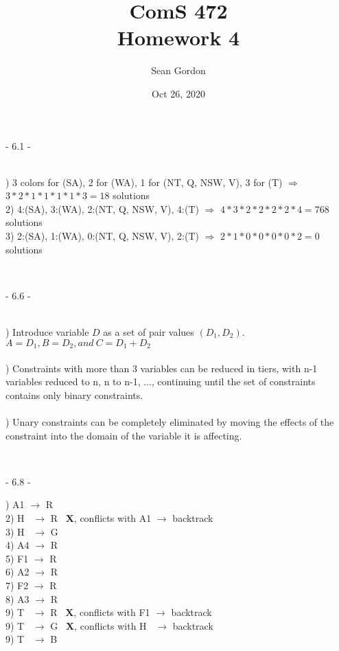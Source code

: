 \documentclass[12pt]{article}
\title{ComS 472\\Homework 4}
\author{Sean Gordon}
\date{Oct 26, 2020}
\begin{document}
\maketitle


\centerline{- 6.1 - }
\ \\
) 3 colors for (SA), 2 for (WA), 1 for (NT, Q, NSW, V), 3 for (T) $\Rightarrow$ \\\indent $3*2*1*1*1*1*3=18$ solutions\\[.4em]
2) 4:(SA), 3:(WA), 2:(NT, Q, NSW, V), 4:(T) $\Rightarrow$ $4*3*2*2*2*2*4=768$ solutions\\[.4em]
3) 2:(SA), 1:(WA), 0:(NT, Q, NSW, V), 2:(T) $\Rightarrow$ $2*1*0*0*0*0*2=0$ solutions



\noindent \hrulefill \\



\centerline{- 6.6 - }
\ \\
) Introduce variable $D$ as a set of pair values $(D_1, D_2)$. $A = D_1, B = D_2, and\ C = D_1+D_2$\\\\
) Constraints with more than 3 variables can be reduced in tiers, with n-1 variables reduced to n, n to n-1, ..., continuing until the set of constraints contains only binary constraints.\\\\
) Unary constraints can be completely eliminated by moving the effects of the constraint into the domain of the variable it is affecting.



\noindent \hrulefill \\



\centerline{- 6.8 - }
) A1 $\rightarrow$ R \ \checkmark\\
2) H \ $\rightarrow$ R \ \textbf{X}, conflicts with A1 $\rightarrow$ backtrack \\
3) H \ $\rightarrow$ G \ \checkmark\\
4) A4 $\rightarrow$ R \ \checkmark\\
5) F1 $\rightarrow$ R \ \checkmark\\
6) A2 $\rightarrow$ R \ \checkmark\\
7) F2 $\rightarrow$ R \ \checkmark\\
8) A3 $\rightarrow$ R \ \checkmark\\
9) T \ $\rightarrow$ R \ \textbf{X}, conflicts with F1 $\rightarrow$ backtrack \\
9) T \ $\rightarrow$ G \ \textbf{X}, conflicts with H \ $\rightarrow$ backtrack \\
9) T \ $\rightarrow$ B \ \checkmark\\
\end{document}
